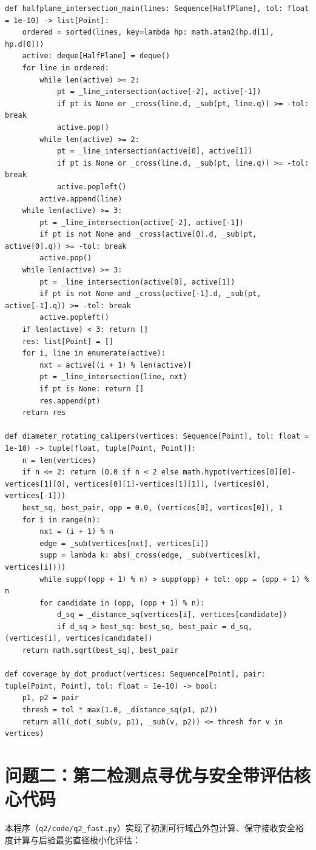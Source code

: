 \begin{lstlisting}[caption={问题一核心算法（q1\_geometry.py）}]
def halfplane_intersection_main(lines: Sequence[HalfPlane], tol: float = 1e-10) -> list[Point]:
    ordered = sorted(lines, key=lambda hp: math.atan2(hp.d[1], hp.d[0]))
    active: deque[HalfPlane] = deque()
    for line in ordered:
        while len(active) >= 2:
            pt = _line_intersection(active[-2], active[-1])
            if pt is None or _cross(line.d, _sub(pt, line.q)) >= -tol: break
            active.pop()
        while len(active) >= 2:
            pt = _line_intersection(active[0], active[1])
            if pt is None or _cross(line.d, _sub(pt, line.q)) >= -tol: break
            active.popleft()
        active.append(line)
    while len(active) >= 3:
        pt = _line_intersection(active[-2], active[-1])
        if pt is not None and _cross(active[0].d, _sub(pt, active[0].q)) >= -tol: break
        active.pop()
    while len(active) >= 3:
        pt = _line_intersection(active[0], active[1])
        if pt is not None and _cross(active[-1].d, _sub(pt, active[-1].q)) >= -tol: break
        active.popleft()
    if len(active) < 3: return []
    res: list[Point] = []
    for i, line in enumerate(active):
        nxt = active[(i + 1) % len(active)]
        pt = _line_intersection(line, nxt)
        if pt is None: return []
        res.append(pt)
    return res

def diameter_rotating_calipers(vertices: Sequence[Point], tol: float = 1e-10) -> tuple[float, tuple[Point, Point]]:
    n = len(vertices)
    if n <= 2: return (0.0 if n < 2 else math.hypot(vertices[0][0]-vertices[1][0], vertices[0][1]-vertices[1][1]), (vertices[0], vertices[-1]))
    best_sq, best_pair, opp = 0.0, (vertices[0], vertices[0]), 1
    for i in range(n):
        nxt = (i + 1) % n
        edge = _sub(vertices[nxt], vertices[i])
        supp = lambda k: abs(_cross(edge, _sub(vertices[k], vertices[i])))
        while supp((opp + 1) % n) > supp(opp) + tol: opp = (opp + 1) % n
        for candidate in (opp, (opp + 1) % n):
            d_sq = _distance_sq(vertices[i], vertices[candidate])
            if d_sq > best_sq: best_sq, best_pair = d_sq, (vertices[i], vertices[candidate])
    return math.sqrt(best_sq), best_pair

def coverage_by_dot_product(vertices: Sequence[Point], pair: tuple[Point, Point], tol: float = 1e-10) -> bool:
    p1, p2 = pair
    thresh = tol * max(1.0, _distance_sq(p1, p2))
    return all(_dot(_sub(v, p1), _sub(v, p2)) <= thresh for v in vertices)
\end{lstlisting}

\section{问题二：第二检测点寻优与安全带评估核心代码}
本程序（\texttt{q2/code/q2\_fast.py}）实现了初测可行域凸外包计算、保守接收安全裕度计算与后验最劣直径极小化评估：

